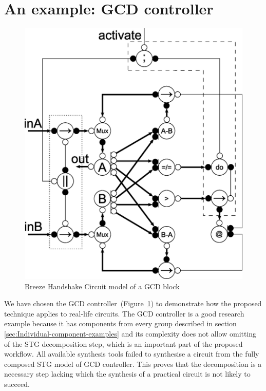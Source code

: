 \section{An example: GCD controller}

\begin{figure}[!t]
\begin{centering}
\includegraphics[width=0.3\paperwidth]{figures/breeze-gcd-partition}
\par\end{centering}

\caption{Breeze Handshake Circuit model of a GCD block\label{fig:GCD}}
\end{figure}


We have chosen the GCD controller~(Figure~\ref{fig:GCD}) to demonstrate
how the proposed technique applies to real-life circuits. The GCD
controller is a good research example because it has components from
every group described in section \ref{sec:Individual-component-examples}
and its complexity does not allow omitting of the STG decomposition
step, which is an important part of the proposed workflow. All available
synthesis tools failed to synthesise a circuit from the fully composed
STG model of GCD controller. This proves that the decomposition is
a necessary step lacking which the synthesis of a practical circuit
is not likely to succeed.

